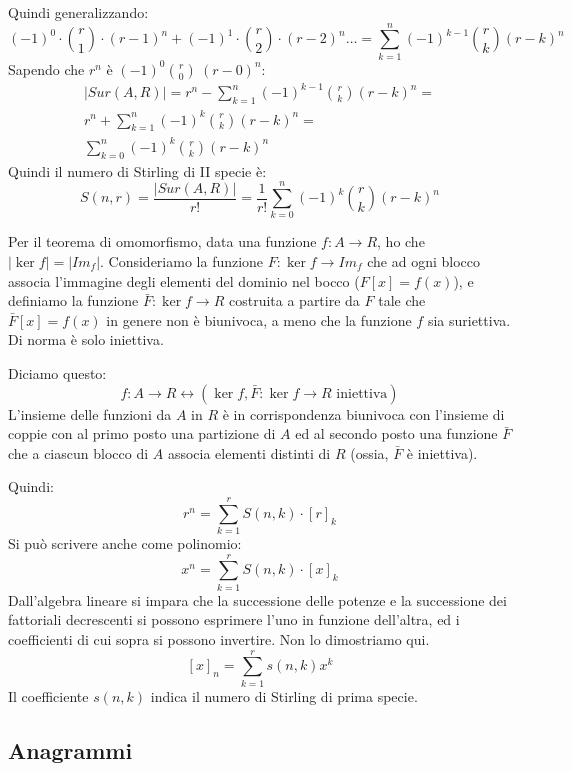 Quindi generalizzando:
\[
(-1)^0 \cdot \binom{r}{1} \cdot (r-1)^n + 
(-1)^1 \cdot \binom{r}{2} \cdot (r-2)^n \dots =
\sum_{k = 1}^{n} (-1)^{k - 1} \binom{r}{k} (r - k)^n
\]
Sapendo che $r^n$ \`e $(-1)^0 \binom{r}{0} \ (r - 0)^n$:
\begin{align*}
|Sur(A,R)| = 
r^n - \sum_{k = 1}^{n} (-1)^{k - 1} \binom{r}{k} (r - k)^n =  \\
r^n + \sum_{k = 1}^{n} (-1)^{k} \binom{r}{k} (r - k)^n =  \\
\sum_{k = 0}^{n} (-1)^{k} \binom{r}{k} (r - k)^n
\end{align*}
Quindi il numero di Stirling di II specie \`e:
\begin{equation}
S(n,r) = \frac{|Sur(A,R)|}{r!} = \frac{1}{r!} \sum_{k = 0}^{n} (-1)^{k} \binom{r}{k} (r - k)^n
\end{equation}

Per il teorema di omomorfismo, data una funzione $f : A \to R$, ho che $|\ker f| = |Im_f|$. Consideriamo la funzione $F : \ker f \to Im_f$ che ad ogni blocco associa l'immagine degli elementi del dominio nel bocco ($F[x] = f(x)$), e definiamo la funzione $\bar F : \ker f \to R$ costruita a partire da $F$ tale che $\bar F [x] = f(x)$ in genere non \`e biunivoca, a meno che la funzione $f$ sia suriettiva. Di norma \`e solo iniettiva.

Diciamo questo:
\begin{equation}
f : A \to R \leftrightarrow ( \ker f , \bar F : \ker f \to R \text{ iniettiva})
\end{equation}
L'insieme delle funzioni da $A$ in $R$ \`e in corrispondenza biunivoca con l'insieme di coppie con al primo posto una partizione di $A$ ed al secondo posto una funzione $\bar F$ che a ciascun blocco di $A$ associa elementi distinti di $R$ (ossia, $\bar F$ \`e iniettiva).

Quindi:
\[
r^n = \sum_{k = 1}^{r} S(n, k) \cdot [r]_k
\]
Si pu\`o scrivere anche come polinomio:
\[
x^n = \sum_{k = 1}^{r} S(n, k) \cdot [x]_k
\]
Dall'algebra lineare si impara che la successione delle potenze e la successione dei fattoriali decrescenti si possono esprimere l'uno in funzione dell'altra, ed i coefficienti di cui sopra si possono invertire. Non lo dimostriamo qui.
\[
[x]_n = \sum_{k = 1}^{r} s(n, k) x^k
\]
Il coefficiente $s(n, k)$ indica il numero di Stirling di prima specie.

\subsection{Anagrammi}


